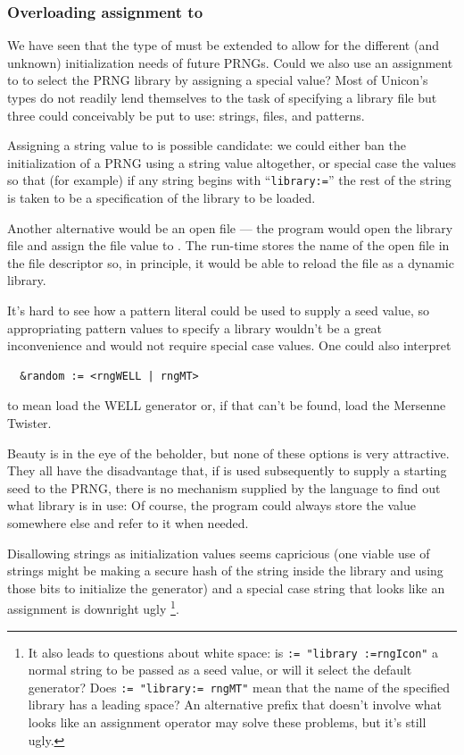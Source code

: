 \documentclass[letterpaper,12pt]{article}
\begin{document}
\subsubsection{Overloading assignment to \rndkwd}

We have seen that the type of \rndkwd must be extended to allow for the
different (and unknown) initialization needs of future PRNGs. Could we also
use an assignment to \rndkwd to select the PRNG library by assigning a
special value? Most of Unicon's types do not readily lend themselves to the
task of specifying a library file but three could conceivably be put to
use: strings, files, and patterns.

Assigning a string value to \rndkwd is possible candidate: we could either
ban the initialization of a PRNG using a string value altogether, or
special case the values so that (for example) if any string begins with
``\texttt{library:=}'' the rest of the string is taken to be a specification
of the library to be loaded.

Another alternative would be an open file --- the program would open the
library file and assign the file value to \rndkwd. The run-time stores the
name of the open file in the file descriptor so, in principle, it would be
able to reload the file as a dynamic library.

It's hard to see how a pattern literal could be used to supply a seed
value, so appropriating pattern values to specify a library wouldn't be a
great inconvenience and would not require special case values.
One could also interpret
\begin{verbatim}
  &random := <rngWELL | rngMT>
\end{verbatim}
to mean load the WELL generator or, if that can't be found, load the
Mersenne Twister.

Beauty is in the eye of the beholder, but none of these options is very
attractive. They all have the disadvantage that, if \rndkwd is used
subsequently to supply a starting seed to the PRNG, there is no mechanism
supplied by the language to find out what library is in use: Of course, the
program could always store the value somewhere else and refer to it when
needed.

Disallowing strings as initialization values seems capricious (one viable
use of strings might be making a secure hash of the string inside the
library and using those bits to initialize the generator) and a special
case string that looks like an assignment is downright ugly%
\footnote{
  It also leads to questions about white space:
  is \texttt{\rndkwd := "library :=rngIcon"} a normal string to be passed
  as a seed value, or will it select the default generator?
  Does \texttt{\rndkwd := "library:= rngMT"} mean that the name of the
  specified library has a leading space?
  An alternative prefix that doesn't involve what looks like an assignment
  operator may solve these problems, but it's still ugly.
}.
\end{document}
